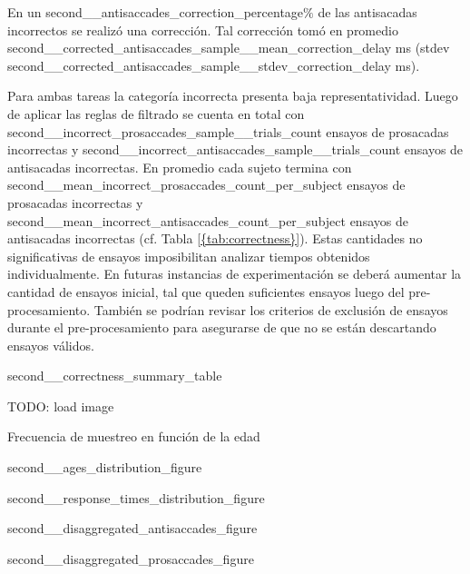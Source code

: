 En un {second__antisaccades_correction_percentage}$\%$ de las antisacadas
incorrectos se realizó una corrección.
Tal corrección tomó en promedio
{second__corrected_antisaccades_sample__mean_correction_delay} ms (stdev
{second__corrected_antisaccades_sample__stdev_correction_delay} ms).


Para ambas tareas la categoría incorrecta presenta baja representatividad.
Luego de aplicar las reglas de filtrado se cuenta en total con
{second__incorrect_prosaccades_sample__trials_count} ensayos de prosacadas
incorrectas y {second__incorrect_antisaccades_sample__trials_count} ensayos de
antisacadas incorrectas.
En promedio cada sujeto termina con
{second__mean_incorrect_prosaccades_count_per_subject} ensayos de prosacadas
incorrectas y {second__mean_incorrect_antisaccades_count_per_subject}
ensayos de antisacadas incorrectas (cf. Tabla \ref{{tab:correctness}}).
Estas cantidades no significativas de ensayos imposibilitan analizar tiempos
obtenidos individualmente.
En futuras instancias de experimentación se deberá aumentar la cantidad de
ensayos inicial, tal que queden suficientes ensayos luego del
pre-procesamiento.
También se podrían revisar los criterios de exclusión de ensayos durante el
pre-procesamiento para asegurarse de que no se están descartando ensayos
válidos.

{second__correctness_summary_table}

\begin{{figure}}
  \centering
  TODO: load image
  \caption{{Frecuencia de muestreo en función de la edad}}
  \label{{fig:sampling-frequency-by-age}}
\end{{figure}}

{second__ages_distribution_figure}

{second__response_times_distribution_figure}

{second__disaggregated_antisaccades_figure}

{second__disaggregated_prosaccades_figure}
